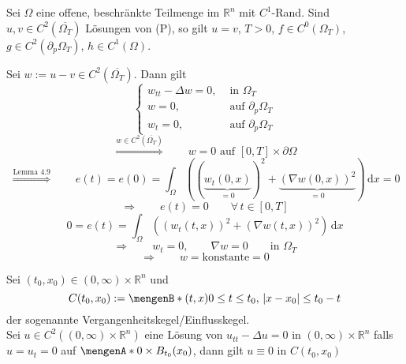 \begin{satz}
	Sei $\Omega$ eine offene, beschränkte Teilmenge im $\mathbb{R}^n$ mit $C^1$-Rand. Sind $u,v \in C^2( \overline{\Omega_T})$ Lösungen von (P), so gilt $u=v$, $T>0$,
	$f \in C^0(\Omega_T)$, $g \in C^2( \partial_p \Omega_T)$, $h \in C^1(\Omega)$.
\end{satz}
\begin{beweis}
	Sei $w:= u-v \in C^2(\overline{\Omega_T})$. Dann gilt \[
		\begin{cases}
			w_{tt}- \Delta w = 0, &\text{ in }\Omega_T\\
			w = 0,&\text{ auf } \partial_p \Omega_T \\
			w_t=0 , &\text{ auf } \partial_p \Omega_T
		\end{cases}
	\]
	\[
		\stackrel{w \in C^2(\overline{\Omega_T})}{\Rightarrow} \qquad w =0 \text{ auf } [0,T] \times \partial \Omega
	\]
	\[
		\stackrel{\text{Lemma }4.9}{\Rightarrow } \qquad e(t) = e(0) = \int_{\Omega}^{} ((\underset{=0}{\underbrace{w_t(0,x)}})^2 
		+ \underset{=0}{\underbrace{(  \nabla w(0,x))^2}}) \,\mathrm{d}x = 0
	\]
	\[
		\Rightarrow \qquad e(t)=0 \qquad \forall\, t \in [0,T]
	\]
	\[
		0 = e(t) = \int_{\Omega}^{}((w_t(t,x))^2+ ( \nabla w(t,x))^2) \,\mathrm{d}x
	\]
	\[
		\Rightarrow \qquad w_t=0, \qquad  \nabla w=0 \qquad \text{in }\Omega_T
	\]
	\[
		\Rightarrow \qquad w = \text{konstante} = 0
	\]
\end{beweis}
\begin{satz}
	Sei $(t_0,x_0) \in (0, \infty) \times \mathbb{R}^n$ und 
	\[
		C(t_0,x_0) := \set[(t,x)]{0 \leq t \leq t_0,\,\abs{x-x_0} \leq t_0-t}
	\]
	der sogenannte Vergangenheitskegel/Einflusskegel. \\
	Sei $u \in C^2((0,\infty) \times \mathbb{R}^n)$ eine Lösung von $u_{tt}-\Delta u =0$ in $(0,\infty) \times \mathbb{R}^n$ falls $u = u_t=0$ auf 
	$\set{0} \times B_{t_0}(x_0)$, dann gilt $u \equiv 0$ in $C(t_0,x_0)$
\end{satz}


